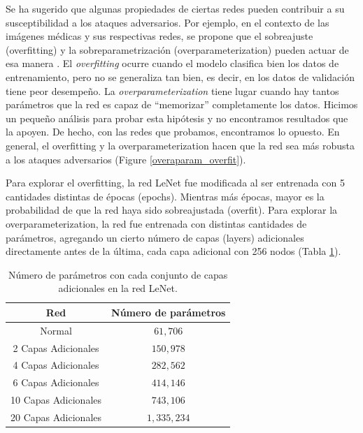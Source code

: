 Se ha sugerido que algunas propiedades de ciertas redes pueden contribuir a su susceptibilidad a los ataques adversarios. Por ejemplo, en el contexto de las imágenes médicas y sus respectivas redes, se propone que el sobreajuste (overfitting) y la sobreparametrización (overparameterization) pueden actuar de esa manera \cite{ma2020understanding}. El \textit{overfitting} ocurre cuando el modelo clasifica bien los datos de entrenamiento, pero no se generaliza tan bien, es decir, en los datos de validación tiene peor desempeño. La \textit{overparameterization} tiene lugar cuando hay tantos parámetros que la red es capaz de ``memorizar'' completamente los datos. Hicimos un pequeño análisis para probar esta hipótesis y no encontramos resultados que la apoyen. De hecho, con las redes que probamos, encontramos lo opuesto. En general, el overfitting y la overparameterization hacen que la red sea más robusta a los ataques adversarios (Figure \ref{overaparam_overfit}).

Para explorar el overfitting, la red LeNet fue modificada al ser entrenada con 5 cantidades distintas de épocas (epochs). Mientras más épocas, mayor es la probabilidad de que la red haya sido sobreajustada (overfit). Para explorar la overparameterization, la red fue entrenada con distintas cantidades de parámetros, agregando un cierto número de capas (layers) adicionales directamente antes de la última, cada capa adicional con 256 nodos (Tabla \ref{overparam_table}).

\renewcommand{\tablename}{Tabla}
\begin{table}[h]
    \centering
    \begin{tabular}{|c|c|}
     \hline
     Red & Número de parámetros  \\ 
     \hline
     Normal & $61,706$  \\ 
     \hline
     2 Capas Adicionales & $150,978$  \\ 
     \hline
     4 Capas Adicionales & $282,562$  \\ 
     \hline
     6 Capas Adicionales & $414,146$  \\ 
     \hline
     10 Capas Adicionales & $743,106$  \\ 
     \hline
     20 Capas Adicionales & $1,335,234$  \\ 
     \hline
    \end{tabular}
    \caption{Número de parámetros con cada conjunto de capas adicionales en la red LeNet.}
    \label{overparam_table}
\end{table}


